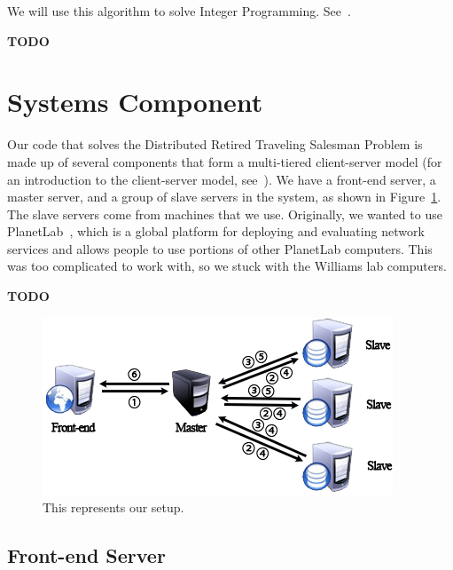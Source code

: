 \documentclass{article}
\begin{document}
We will use this algorithm to solve Integer Programming. See~\cite{doi:10.1287/opre.13.4.517}.

{\bf TODO}




\section{Systems Component}\label{sec:systems}

Our code that solves the Distributed Retired Traveling Salesman Problem is made up of several components that form a multi-tiered client-server model
(for an introduction to the client-server model, see~\cite{Tanenbaum:2006:DSP:1202502}).  We have a front-end server, a master server, and a group of
slave servers in the system, as shown in Figure~\ref{fig:machines}. The slave servers come from machines that we use. Originally, we wanted to use
PlanetLab~\cite{conf/osdi/PetersonBFM06}, which is a global platform for deploying and evaluating network services and allows people to use portions
of other PlanetLab computers. This was too complicated to work with, so we stuck with the Williams lab computers.

{\bf TODO}

\begin{figure}[t]
\vskip 0.2in
\begin{center}
\centerline{\includegraphics[width=\columnwidth]{servers}}
\caption{This represents our setup.}
\label{fig:machines}
\end{center}
\vskip -0.2in
\end{figure}

\subsection{Front-end Server}\label{sec:front_end_server}
\end{document}

